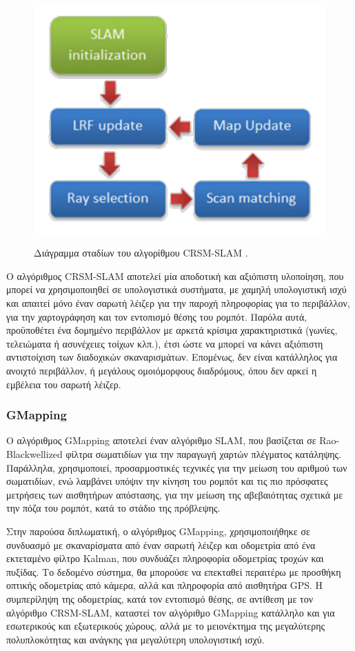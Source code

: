 \begin{figure}[!ht]
	\centering
	\includegraphics[width=0.35\linewidth]{Chapters/Chapter3/Figures/crsm_slam_diagram.png}
	\label{fig:crsm_slam_diagram.png}
	\caption[Διάγραμμα σταδίων του αλγορίθμου CRSM-SLAM.]{Διάγραμμα σταδίων του αλγορίθμου CRSM-SLAM \cite{crsm}.}
\end{figure}


\bigskip
Ο αλγόριθμος {CRSM-SLAM} αποτελεί μία αποδοτική και αξιόπιστη υλοποίηση, που μπορεί να χρησιμοποιηθεί σε υπολογιστικά συστήματα, με χαμηλή υπολογιστική ισχύ και απαιτεί μόνο έναν {σαρωτή λέιζερ} για την παροχή πληροφορίας για το περιβάλλον, για την χαρτογράφηση και τον εντοπισμό θέσης του ρομπότ. Παρόλα αυτά, προϋποθέτει ένα δομημένο περιβάλλον με αρκετά {κρίσιμα} χαρακτηριστικά (γωνίες, τελειώματα ή ασυνέχειες τοίχων κλπ.), έτσι ώστε να μπορεί να κάνει αξιόπιστη αντιστοίχιση των διαδοχικών σκαναρισμάτων. Επομένως, δεν είναι κατάλληλος για ανοιχτό περιβάλλον, ή μεγάλους ομοιόμορφους διαδρόμους, όπου δεν αρκεί η εμβέλεια του {σαρωτή λέιζερ}. 

\subsubsection{GMapping} \label{sssec:gmapping}
Ο αλγόριθμος {GMapping} αποτελεί έναν αλγόριθμο {SLAM}, που βασίζεται σε {Rao-Blackwellized φίλτρα σωματιδίων} για την παραγωγή {χαρτών πλέγματος κατάληψης}. Παράλληλα, χρησιμοποιεί, προσαρμοστικές τεχνικές για την μείωση του αριθμού των σωματιδίων, ενώ λαμβάνει υπόψιν την κίνηση του ρομπότ και τις πιο πρόσφατες μετρήσεις των αισθητήρων απόστασης, για την μείωση της αβεβαιότητας σχετικά με την πόζα του ρομπότ, κατά το στάδιο της πρόβλεψης.

\bigskip
Στην παρούσα διπλωματική, ο αλγόριθμος GMapping, χρησιμοποιήθηκε σε συνδυασμό με σκαναρίσματα από έναν σαρωτή λέιζερ και οδομετρία από ένα εκτεταμένο φίλτρο Kalman, που συνδυάζει πληροφορία οδομετρίας τροχών και πυξίδας. Το δεδομένο σύστημα, θα μπορούσε να επεκταθεί περαιτέρω με προσθήκη οπτικής οδομετρίας από κάμερα, αλλά και πληροφορία από αισθητήρα {GPS}. Η συμπερίληψη της οδομετρίας, κατά τον εντοπισμό θέσης, σε αντίθεση με τον αλγόριθμο {CRSM-SLAM}, καταστεί τον αλγόριθμο {GMapping} κατάλληλο και για εσωτερικούς και εξωτερικούς χώρους, αλλά με το μειονέκτημα της μεγαλύτερης πολυπλοκότητας και ανάγκης για μεγαλύτερη υπολογιστική ισχύ.

